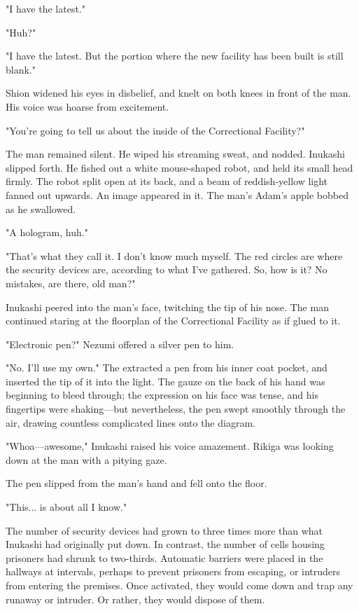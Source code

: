 "I have the latest."

"Huh?"

"I have the latest. But the portion where the new facility has been
built is still blank."

Shion widened his eyes in disbelief, and knelt on both knees in front of
the man. His voice was hoarse from excitement.

"You're going to tell us about the inside of the Correctional Facility?"

The man remained silent. He wiped his streaming sweat, and nodded.
Inukashi slipped forth. He fished out a white mouse-shaped robot, and
held its small head firmly. The robot split open at its back, and a beam
of reddish-yellow light fanned out upwards. An image appeared in it. The
man's Adam's apple bobbed as he swallowed.

"A hologram, huh."

"That's what they call it. I don't know much myself. The red circles are
where the security devices are, according to what I've gathered. So, how
is it? No mistakes, are there, old man?"

Inukashi peered into the man's face, twitching the tip of his nose. The
man continued staring at the floorplan of the Correctional Facility as
if glued to it.

"Electronic pen?" Nezumi offered a silver pen to him.

"No. I'll use my own." The extracted a pen from his inner coat pocket,
and inserted the tip of it into the light. The gauze on the back of his
hand was beginning to bleed through; the expression on his face was
tense, and his fingertips were shaking---but nevertheless, the pen swept
smoothly through the air, drawing countless complicated lines onto the
diagram.

"Whoa---awesome," Inukashi raised his voice amazement. Rikiga was looking
down at the man with a pitying gaze.

The pen slipped from the man's hand and fell onto the floor.

"This... is about all I know."

The number of security devices had grown to three times more than what
Inukashi had originally put down. In contrast, the number of cells
housing prisoners had shrunk to two-thirds. Automatic barriers were
placed in the hallways at intervals, perhaps to prevent prisoners from
escaping, or intruders from entering the premises. Once activated, they
would come down and trap any runaway or intruder. Or rather, they would
dispose of them.

